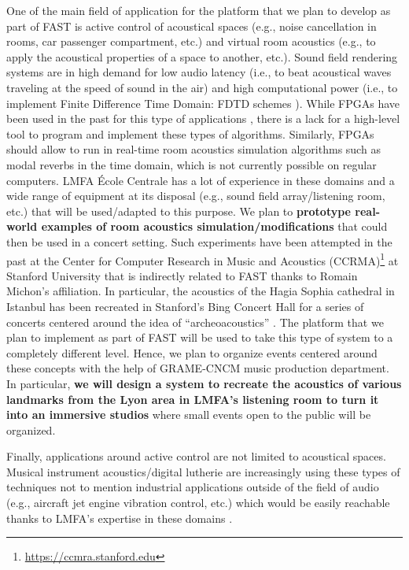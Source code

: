 \documentclass[a4paper,9pt]{extarticle}
\newcommand{\PP}{FAST}
\begin{document}
One of the main field of application for the platform that we plan to develop as part of \PP{} is active control of acoustical spaces (e.g., noise cancellation in rooms, car passenger compartment, etc.) and virtual room acoustics (e.g., to apply the acoustical properties of a space to another, etc.). Sound field rendering systems are in high demand for low audio latency (i.e., to beat acoustical waves traveling at the speed of sound in the air) and high computational power (i.e., to implement Finite Difference Time Domain: FDTD schemes \cite{Bilbao2009}). While FPGAs have been used in the past for this type of applications \cite{Tan2019}, there is a lack for a high-level tool to program and implement these types of algorithms. Similarly, FPGAs should allow to run in real-time room acoustics simulation algorithms such as modal reverbs \cite{Abel2019} in the time domain, which is not currently possible on regular computers. LMFA École Centrale has a lot of experience in these domains and a wide range of equipment at its disposal (e.g., sound field array/listening room, etc.) that will be used/adapted to this purpose. We plan to \textbf{prototype real-world examples of room acoustics simulation/modifications} that could then be used in a concert setting. Such experiments have been attempted in the past at the Center for Computer Research in Music and Acoustics (CCRMA)\footnote{\url{https://ccmra.stanford.edu}} at Stanford University that is indirectly related to \PP{} thanks to Romain Michon's affiliation. In particular, the acoustics of the Hagia Sophia cathedral in Istanbul has been recreated in Stanford's Bing Concert Hall for a series of concerts centered around the idea of ``archeoacoustics'' \cite{Abel2009}. The platform that we plan to implement as part of \PP{} will be used to take this type of system to a completely different level. Hence, we plan to organize events centered around these concepts with the help of GRAME-CNCM music production department. In particular, \textbf{we will design a system to recreate the acoustics of various landmarks from the Lyon area in LMFA's listening room to turn it into an immersive studios} where small events open to the public will be organized. 

Finally, applications around active control are not limited to acoustical spaces. Musical instrument acoustics/digital lutherie are increasingly using these types of techniques \cite{Zhang2018} not to mention industrial applications outside of the field of audio (e.g., aircraft jet engine vibration control, etc.) which would be easily reachable thanks to LMFA's expertise in these domains \cite{salze2019new}.
\end{document}
